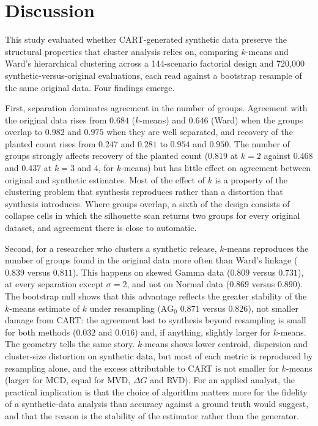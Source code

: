 \documentclass[pdflatex,referee]{sn-jnl}
\begin{document}
\section{Discussion}

This study evaluated whether CART-generated synthetic data preserve the
structural properties that cluster analysis relies on, comparing $k$-means and
Ward's hierarchical clustering across a 144-scenario factorial design and
720{,}000 synthetic-versus-original evaluations, each read against a bootstrap
resample of the same original data. Four findings emerge.

First, separation dominates agreement in the number of groups. Agreement with
the original data rises from $0.684$ ($k$-means) and $0.646$ (Ward) when the
groups overlap to $0.982$ and $0.975$ when they are well separated, and
recovery of the planted count rises from $0.247$ and $0.281$ to $0.954$ and
$0.950$. The number
of groups strongly affects recovery of the planted count ($0.819$ at $k = 2$
against $0.468$ and $0.437$ at $k = 3$ and $4$, for $k$-means) but has little
effect on agreement between original and synthetic estimates. Most of the
effect of $k$ is a property of the clustering problem that synthesis
reproduces rather than a distortion that synthesis introduces. Where groups
overlap, a sixth of the design consists of collapse cells in which the
silhouette scan returns two groups for every original dataset, and agreement
there is close to automatic.

Second, for a researcher who clusters a synthetic release, $k$-means
reproduces the number of groups found in the original data more often than
Ward's linkage ($0.839$ versus $0.811$). This happens on skewed Gamma data
($0.809$ versus $0.731$), at every separation except $\sigma = 2$, and not on
Normal data ($0.869$ versus $0.890$). The bootstrap null shows that this
advantage reflects the greater stability of the $k$-means estimate of $k$
under resampling ($\mathrm{AG}_0$ $0.871$ versus $0.826$), not smaller damage
from CART: the agreement lost to synthesis beyond resampling is small for
both methods ($0.032$ and $0.016$) and, if anything, slightly larger for
$k$-means. The geometry tells the same story. $k$-means shows lower centroid,
dispersion and cluster-size distortion on synthetic data, but most of each
metric is reproduced by resampling alone, and the excess attributable to CART
is not smaller for $k$-means (larger for MCD, equal for MVD, $\Delta G$ and
RVD). For an applied analyst, the practical implication is that the choice of
algorithm matters more for the fidelity of a synthetic-data analysis than
accuracy against a ground truth would suggest, and that the reason is the
stability of the estimator rather than the generator.
\end{document}
